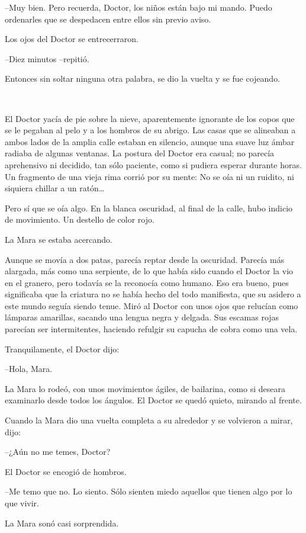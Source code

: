 --Muy bien. Pero recuerda, Doctor, los niños están bajo mi mando. Puedo ordenarles que se despedacen entre ellos sin previo aviso.

Los ojos del Doctor se entrecerraron.

--Diez minutos --repitió.

Entonces sin soltar ninguna otra palabra, se dio la vuelta y se fue cojeando.

~

El Doctor yacía de pie sobre la nieve, aparentemente ignorante de los copos que se le pegaban al pelo y a los hombros de su abrigo. Las casas que se alineaban a ambos lados de la amplia calle estaban en silencio, aunque una suave luz ámbar radiaba de algunas ventanas. La postura del Doctor era casual; no parecía aprehensivo ni decidido, tan sólo paciente, como si pudiera esperar durante horas. Un fragmento de una vieja rima corrió por su mente: No se oía ni un ruidito, ni siquiera chillar a un ratón…

Pero sí que se oía algo. En la blanca oscuridad, al final de la calle, hubo indicio de movimiento. Un destello de color rojo.

La Mara se estaba acercando.

Aunque se movía a dos patas, parecía reptar desde la oscuridad. Parecía más alargada, más como una serpiente, de lo que había sido cuando el Doctor la vio en el granero, pero todavía se la reconocía como humano. Eso era bueno, pues significaba que la criatura no se había hecho del todo manifiesta, que su asidero a este mundo seguía siendo tenue. Miró al Doctor con unos ojos que relucían como lámparas amarillas, sacando una lengua negra y delgada. Sus escamas rojas parecían ser intermitentes, haciendo refulgir su capucha de cobra como una vela.

Tranquilamente, el Doctor dijo:

--Hola, Mara.

La Mara lo rodeó, con unos movimientos ágiles, de bailarina, como si deseara examinarlo desde todos los ángulos. El Doctor se quedó quieto, mirando al frente.

Cuando la Mara dio una vuelta completa a su alrededor y se volvieron a mirar, dijo:

--¿Aún no me temes, Doctor?

El Doctor se encogió de hombros.

--Me temo que no. Lo siento. Sólo sienten miedo aquellos que tienen algo por lo que vivir.

La Mara sonó casi sorprendida.

